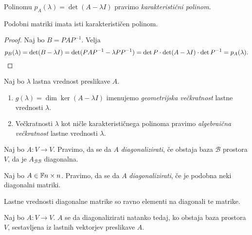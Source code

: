 \documentclass[12pt, a4paper]{article}
\begin{document}
\begin{definicija}
Polinomu $p_A(\lambda)=\det(A-\lambda I)$ pravimo \emph{karakteristični polinom}.
\end{definicija}

\begin{trditev}
Podobni matriki imata isti karakterističen polinom.
\end{trditev}

\begin{proof}
Naj bo $B=PAP^{-1}$. Velja
\[
p_B(\lambda)=\det(B-\lambda I)=\det(PAP^{-1}-\lambda PP^{-1})=\det P\cdot \det(A-\lambda I)\cdot\det P^{-1}=p_A(\lambda).\qedhere
\]
\end{proof}

\begin{definicija}
Naj bo $\lambda$ lastna vrednost preslikave $A$.
\begin{enumerate}[label=\alph*)]
\item $g(\lambda)=\dim\ker(A-\lambda I)$ imenujemo \emph{geometrijska večkratnost} lastne vrednosti $\lambda$.
\item Večkratnosti $\lambda$ kot ničle karakterističnega polinoma pravimo \emph{algebraična večkratnost} lastne vrednosti $\lambda$.
\end{enumerate}
\end{definicija}

\begin{definicija}
Naj bo $A\colon V\to V$. Pravimo, da se da $A$ \emph{diagonalizirati}, če obstaja baza $\mathcal{B}$ prostora $V$, da je $A_{\mathcal{BB}}$ diagonalna.

Naj bo $A\in\mathbb{F}{n\times n}$. Pravimo, da se da $A$ \emph{diagonalizirati}, če je podobna neki diagonalni matriki.
\end{definicija}

\begin{trditev}
Lastne vrednosti diagonalne matrike so ravno elementi na diagonali te matrike.
\end{trditev}

\obvs

\begin{izrek}
Naj bo $A\colon V\to V$. $A$ se da diagonalizirati natanko tedaj, ko obstaja baza prostora $V$, sestavljena iz lastnih vektorjev preslikave $A$.
\end{izrek}

\obvs
\end{document}
